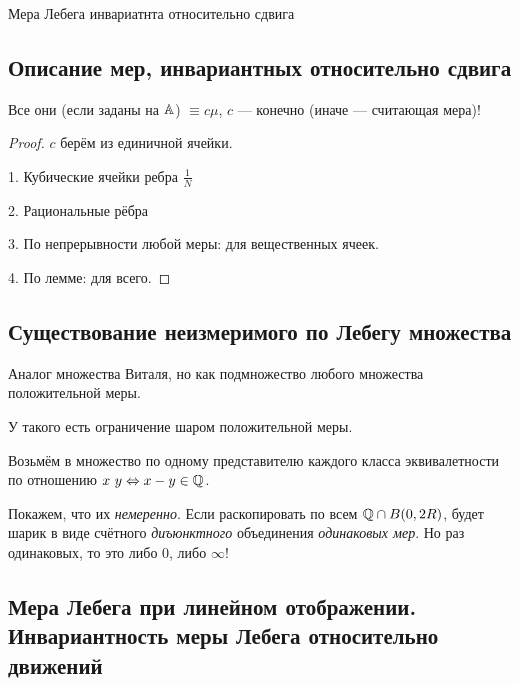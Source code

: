 \documentclass[12pt, a4paper, oneside]{memoir}
\begin{document}
\begin{corollary}
    Мера Лебега инвариатнта относительно сдвига
\end{corollary}



\subsection{Описание мер, инвариантных относительно сдвига}

\begin{theorem}

    Все они (если заданы на ${\mathbb{A}}$) $\equiv c \mu$, $c$ — конечно (иначе — считающая мера)!

    \begin{proof}
        $c$ берём из единичной ячейки.

        1. Кубические ячейки ребра $\frac{1}{N}$

        2. Рациональные рёбра
        
        3. По непрерывности любой меры: для вещественных ячеек.

        4. По лемме: для всего.
    \end{proof}
\end{theorem}


\subsection{Существование неизмеримого по Лебегу множества}

Аналог множества Виталя, но как подмножество любого множества положительной меры.

У такого есть ограничение шаром положительной меры.

Возьмём в множество по одному представителю каждого 
класса эквивалетности по отношению $x ~ y \Leftrightarrow x - y \in {\mathbb{Q}}$.

Покажем, что их \textit{немеренно}. Если раскопировать по всем ${\mathbb{Q}} \cap B(0, 2R)$,
будет шарик в виде счётного \textit{диъюнктного} объединения \textit{одинаковых мер}.
Но раз одинаковых, то это либо $0$, либо $\infty$!


\subsection{Мера Лебега при линейном отображении.
Инвариантность меры Лебега относительно движений}
\end{document}
